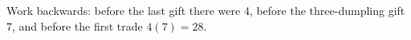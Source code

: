 Work backwards: before the last gift there were 4, before the three-dumpling gift 7, and before the first trade $4(7)=\boxed{28}$.
